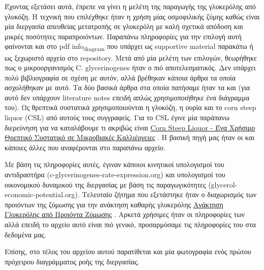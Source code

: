 \documentclass[11pt]{article}
\begin{document}
Έχοντας εξετάσει αυτά, έπρεπε να γίνει η μελέτη της παραγωγής της γλυκερόλης από γλυκόζη. Η τεχνική που επιλέχθηκε ήταν η χρήση μίας οσμοφιλικής ζύμης καθώς είναι μία διεργασία απευθείας μετατροπής σε γλυκερόλη με καλή σχετικά απόδοση και μικρές ποσότητες παραπροιόντων. Παραπάνω πληροφορίες για την επιλογή αυτή φαίνονται και στο pdf info\textsubscript{diagram} που υπάρχει ως supportive material παρακάτω ή ως ξεχωριστό αρχείο στο repository. Μετά από μία μελέτη των επιλογών, θεωρήθηκε πως ο μικροοργανισμός C. glycerinogenes ήταν ο πιό αποτελεσματικός. Δεν υπάρχει πολύ βιβλιογραφία σε σχέση με αυτόν, αλλά βρέθηκαν κάποια άρθρα τα οποία ασχολήθηκαν με αυτό. Τα δύο βασικά άρθρα στα οποία πατήσαμε ήταν τα \cite{zhugeGlycerolProductionNovel2001} και \cite{jinByproductFormationNovel2003} (για αυτό δεν υπάρχουν literature notes επειδή απλώς χρησιμοποιήθηκε ένα διάγραμμα του). Ως θρεπτικά συστατικά χρησιμοποιούνται η γλυκόζη, η ουρία και το corn steep liquor (CSL) από αυτούς τους συγγραφείς. Για το CSL έγινε μία παράπανω διερεύνηση για να καταλάβουμε τι ακριβώς είναι \href{\detokenize{../../../../org_roam/corn_steep_liquor_ενα_χρησιμο_θρεπτικο_συστατικο_σε_μικροβιακες_καλλιεργειες-12-11-22.org}}{Corn Steep Liquor - Ένα Χρήσιμο Θρεπτικό Συστατικό σε Μικροβιακές Καλλιέργειες} . Η βασική πηγή μας ήταν οι \cite{liggettCORNSTEEPLIQUOR} και κάποιες άλλες που αναφέρονται στο παραπάνω αρχείο.

Με βάση τις πληροφορίες αυτές, έγιναν κάποιοι κινητικοί υπολογισμοί του αντιδραστήρα (c-glycerinogenes-rate-expression.org) και υπολογισμοί του οικονομικού δυναμικού της διεργασίας με βάση τις παραγωγικότητες (glycerol-economic-potential.org). Τελευταίο ζήτημα που εξετάστηκε ήταν ο διαχωρισμός των προιόντων της ζύμωσης για την ανάκτηση καθαρής γλυκερόλης \href{\detokenize{../../../../org_roam/ανακτηση_γλυκερολης_απο_προιοντα_ζυμωσης-07-11-22.org}}{Ανάκτηση Γλυκερόλης από Προιόντα Ζύμωσης} . Αρκετά χρήσιμες ήταν οι πληροφορίες των \cite{wallersteinMethodRecoveringGlycerol1946} αλλά επειδή το αρχείο αυτό είναι πιό γενικό, προσαρμόσαμε τις πληροφορίες του στα δεδομένα μας.

Επίσης, στο τέλος του αρχείου αυτού παρατίθεται και μία φωτογραφία ενός πρώτου πρόχειρου διαγράμματος ροής της διεργασίας.
\end{document}
